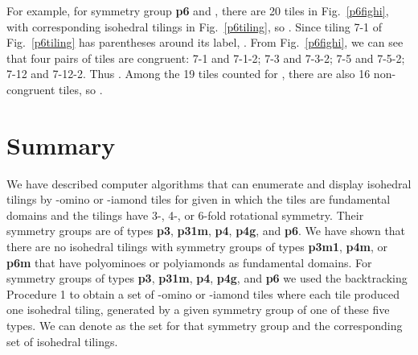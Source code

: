 \documentclass{ws-ijcga}
\begin{document}
\begin{table}[h]
\label{tbl6}
\end{table}



For example, for symmetry group {\bf p6} and , 
there are 20 tiles in Fig.~\ref{p6fighi}, with
corresponding isohedral tilings in Fig.~\ref{p6tiling}, so . 
Since tiling 7-1 of Fig.~\ref{p6tiling} has parentheses
around its label, . 
From Fig.~\ref{p6fighi}, 
we can see that four pairs of tiles are congruent: 7-1 and
7-1-2; 7-3 and 7-3-2; 7-5 and 7-5-2; 7-12 and 7-12-2. 
Thus . 
Among the 19 tiles counted for , there are also 16 non-congruent tiles, so .









\section{Summary}
We have described computer algorithms that can enumerate and display isohedral tilings by 
-omino or -iamond tiles for given  in which the tiles are fundamental domains and the tilings
have 3-, 4-, or 6-fold rotational symmetry. 
Their symmetry groups are of types {\bf p3}, {\bf p31m}, {\bf p4}, {\bf p4g}, and {\bf p6}. 
We have shown that there are no isohedral tilings with symmetry groups of types
{\bf p3m1}, {\bf p4m}, or {\bf p6m} that have polyominoes or polyiamonds as fundamental domains. 
For symmetry groups of types {\bf p3}, {\bf p31m}, {\bf p4}, {\bf p4g}, 
and {\bf p6} we used the backtracking Procedure 1 to obtain a set  of -omino 
or -iamond tiles where each tile produced one isohedral tiling,
generated by a given symmetry group  of one of these five types. 
We can denote  as the set  for that symmetry group  
and  the corresponding set of isohedral tilings.
\end{document}

